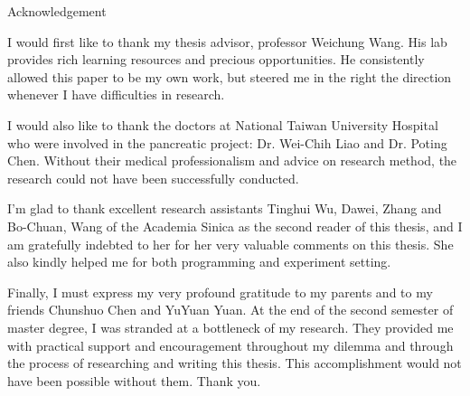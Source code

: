 

\doublespacing

\begin{center}
\Large{{Acknowledgement}}\\
\end{center}
I would first like to thank my thesis advisor, professor Weichung Wang. His lab provides rich learning resources and precious opportunities. He consistently allowed this paper to be my own work, but steered me in the right the direction whenever I have difficulties in research. 

I would also like to thank the doctors at National Taiwan University Hospital who were involved in the pancreatic project: Dr. Wei-Chih Liao and Dr. Poting Chen. Without their medical professionalism and advice on research method, the research could not have been successfully conducted. 

I'm glad to thank excellent research assistants Tinghui Wu, Dawei, Zhang and Bo-Chuan, Wang of the Academia Sinica as the second reader of this thesis, and I am gratefully indebted to her for her very valuable comments on this thesis. She also kindly helped me for both programming and experiment setting. 

Finally, I must express my very profound gratitude to my parents and to my friends Chunshuo Chen and YuYuan Yuan. At the end of the second semester of master degree, I was stranded at a bottleneck of my research. They provided me with practical support and encouragement throughout my dilemma and through the process of researching and writing this thesis.  This accomplishment would not have been possible without them. Thank you. 
